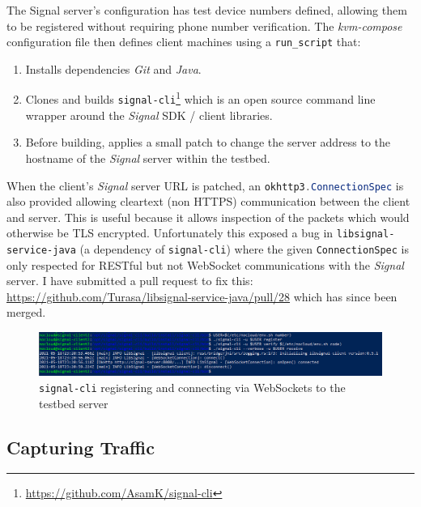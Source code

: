 \documentclass[
    author={Jacob Daniel Halsey},
    supervisor={Prof. Awais Rashid},
    degree={BSc},
    title={Building a Testbed for Evaluating Privacy Enhancing Technologies  (PETs)},
    subtitle={},
    type={software development},
    year={2021}
]{dissertation}
\begin{document}
The Signal server's configuration has test device numbers defined, allowing them
to be registered without requiring phone number verification.
The \emph{kvm-compose} configuration file then defines client 
machines using a \texttt{run\_script} that:

\begin{singlespace}
	\begin{enumerate}
		\item Installs dependencies \emph{Git} and \emph{Java}.
		\item Clones and builds \texttt{signal-cli}\footnote{\url{https://github.com/AsamK/signal-cli}}
		which is an open source command line wrapper around the \emph{Signal} SDK / client libraries.
		\item Before building, applies a small patch to change the server address to the hostname of the 
		\emph{Signal} server within the testbed. 
	\end{enumerate}
\end{singlespace}

When the client's \emph{Signal} server URL is patched, an \lstinline[language=java]|okhttp3.ConnectionSpec|
is also provided allowing cleartext (non HTTPS) communication between the client and server. This is useful
because it allows inspection of the packets which would otherwise be TLS encrypted. Unfortunately this 
exposed a bug in \texttt{libsignal-service-java} (a dependency of \texttt{signal-cli}) where the given
\lstinline[language=java]|ConnectionSpec| is only respected for RESTful but not WebSocket communications
with the \emph{Signal} server. I have submitted a pull request to fix this: \url{https://github.com/Turasa/libsignal-service-java/pull/28} which has since been merged.

\begin{figure}
	\centering
	\includegraphics[width=16cm]{img/signal-cli}
	\caption{\texttt{signal-cli} registering and connecting via WebSockets to the testbed server}
	\label{fig:signal_cli}
\end{figure}

\subsection{Capturing Traffic}
\label{sect:capturing}
\end{document}
